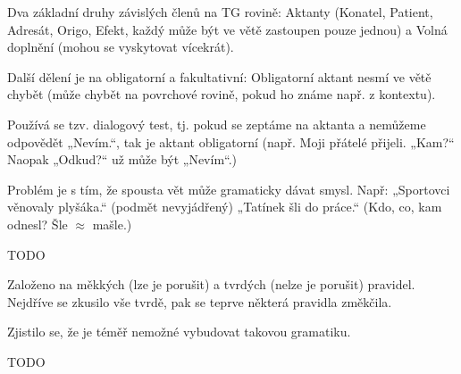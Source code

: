 \documentclass[12pt]{article}					%
\begin{document}
	\begin{definice}[Valence]
		Dva základní druhy závislých členů na TG rovině: Aktanty (Konatel, Patient, Adresát, Origo, Efekt, každý může být ve větě zastoupen pouze jednou) a Volná doplnění (mohou se vyskytovat vícekrát).
		
		Další dělení je na obligatorní a fakultativní: Obligatorní aktant nesmí ve větě chybět (může chybět na povrchové rovině, pokud ho známe např. z kontextu).

		Používá se tzv. dialogový test, tj. pokud se zeptáme na aktanta a nemůžeme odpovědět „Nevím.“, tak je aktant obligatorní (např. Moji přátelé přijeli. „Kam?“ Naopak „Odkud?“ už může být „Nevím“.)
	\end{definice}

	\begin{definice}
		Problém je s tím, že spousta vět může gramaticky dávat smysl. Např: „Sportovci věnovaly plyšáka.“ (podmět nevyjádřený) „Tatínek šli do práce.“ (Kdo, co, kam odnesl? Šle $\approx$ mašle.)
	\end{definice}

	\begin{definice}[RFODG]
		TODO

		Založeno na měkkých (lze je porušit) a tvrdých (nelze je porušit) pravidel. Nejdříve se zkusilo vše tvrdě, pak se teprve některá pravidla změkčila.

		Zjistilo se, že je téměř nemožné vybudovat takovou gramatiku.
	\end{definice}

	\begin{definice}[LanGR]
		TODO
	\end{definice}
\end{document}
